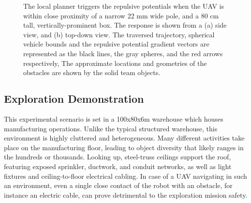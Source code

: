 \documentclass[letterpaper, 10 pt, conference]{ieeeconf}  %
\begin{document}
\begin{figure}[h!]
		\centering
		\newline
		\caption{The local planner triggers the repulsive potentials when the UAV is within close proximity of a narrow 22 mm wide pole, and a 80 cm tall, vertically-prominent box. The response is shown from a (a) side view, and (b) top-down view. The traversed trajectory, spherical vehicle bounds and the repulsive potential gradient vectors are represented as the black lines, the gray spheres, and the red arrows respectively, The approximate locations and geometries of the obstacles are shown by the solid team objects.}
		\label{fig:uav_local_control_box_pole}
\end{figure}

\subsection{Exploration Demonstration}

This experimental scenario is set in a 100x80x6m warehouse which houses manufacturing operations. Unlike the typical structured warehouse, this environment is highly cluttered and heterogeneous. Many different activities take place on the manufacturing floor, leading to object diversity that likely ranges in the hundreds or thousands. Looking up, steel-truss ceilings support the roof, featuring exposed sprinkler, ductwork, and conduit networks, as well as light fixtures and ceiling-to-floor electrical cabling. In case of a UAV navigating in such an environment, even a single close contact of the robot with an obstacle, for instance an electric cable, can prove detrimental to the exploration mission safety. \par
\end{document}

